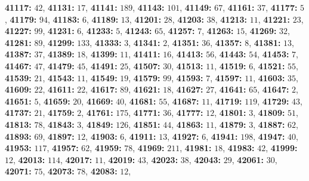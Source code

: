 \textsf{\bfseries 41117:} $42$, \textsf{\bfseries 41131:} $17$, \textsf{\bfseries 41141:} $189$, \textsf{\bfseries 41143:} $101$, \textsf{\bfseries 41149:} $67$, \textsf{\bfseries 41161:} $37$, \textsf{\bfseries 41177:} $5$, \textsf{\bfseries 41179:} $94$, \textsf{\bfseries 41183:} $6$, \textsf{\bfseries 41189:} $13$, \textsf{\bfseries 41201:} $28$, \textsf{\bfseries 41203:} $38$, \textsf{\bfseries 41213:} $11$, \textsf{\bfseries 41221:} $23$, \textsf{\bfseries 41227:} $99$, \textsf{\bfseries 41231:} $6$, \textsf{\bfseries 41233:} $5$, \textsf{\bfseries 41243:} $65$, \textsf{\bfseries 41257:} $7$, \textsf{\bfseries 41263:} $15$, \textsf{\bfseries 41269:} $32$, \textsf{\bfseries 41281:} $89$, \textsf{\bfseries 41299:} $133$, \textsf{\bfseries 41333:} $3$, \textsf{\bfseries 41341:} $2$, \textsf{\bfseries 41351:} $36$, \textsf{\bfseries 41357:} $8$, \textsf{\bfseries 41381:} $13$, \textsf{\bfseries 41387:} $37$, \textsf{\bfseries 41389:} $18$, \textsf{\bfseries 41399:} $11$, \textsf{\bfseries 41411:} $16$, \textsf{\bfseries 41413:} $56$, \textsf{\bfseries 41443:} $54$, \textsf{\bfseries 41453:} $7$, \textsf{\bfseries 41467:} $47$, \textsf{\bfseries 41479:} $45$, \textsf{\bfseries 41491:} $25$, \textsf{\bfseries 41507:} $30$, \textsf{\bfseries 41513:} $11$, \textsf{\bfseries 41519:} $6$, \textsf{\bfseries 41521:} $55$, \textsf{\bfseries 41539:} $21$, \textsf{\bfseries 41543:} $11$, \textsf{\bfseries 41549:} $19$, \textsf{\bfseries 41579:} $99$, \textsf{\bfseries 41593:} $7$, \textsf{\bfseries 41597:} $11$, \textsf{\bfseries 41603:} $35$, \textsf{\bfseries 41609:} $22$, \textsf{\bfseries 41611:} $22$, \textsf{\bfseries 41617:} $89$, \textsf{\bfseries 41621:} $18$, \textsf{\bfseries 41627:} $27$, \textsf{\bfseries 41641:} $65$, \textsf{\bfseries 41647:} $2$, \textsf{\bfseries 41651:} $5$, \textsf{\bfseries 41659:} $20$, \textsf{\bfseries 41669:} $40$, \textsf{\bfseries 41681:} $55$, \textsf{\bfseries 41687:} $11$, \textsf{\bfseries 41719:} $119$, \textsf{\bfseries 41729:} $43$, \textsf{\bfseries 41737:} $21$, \textsf{\bfseries 41759:} $2$, \textsf{\bfseries 41761:} $175$, \textsf{\bfseries 41771:} $36$, \textsf{\bfseries 41777:} $12$, \textsf{\bfseries 41801:} $3$, \textsf{\bfseries 41809:} $51$, \textsf{\bfseries 41813:} $78$, \textsf{\bfseries 41843:} $3$, \textsf{\bfseries 41849:} $126$, \textsf{\bfseries 41851:} $44$, \textsf{\bfseries 41863:} $11$, \textsf{\bfseries 41879:} $3$, \textsf{\bfseries 41887:} $62$, \textsf{\bfseries 41893:} $69$, \textsf{\bfseries 41897:} $12$, \textsf{\bfseries 41903:} $6$, \textsf{\bfseries 41911:} $13$, \textsf{\bfseries 41927:} $6$, \textsf{\bfseries 41941:} $198$, \textsf{\bfseries 41947:} $40$, \textsf{\bfseries 41953:} $117$, \textsf{\bfseries 41957:} $62$, \textsf{\bfseries 41959:} $78$, \textsf{\bfseries 41969:} $211$, \textsf{\bfseries 41981:} $18$, \textsf{\bfseries 41983:} $42$, \textsf{\bfseries 41999:} $12$, \textsf{\bfseries 42013:} $114$, \textsf{\bfseries 42017:} $11$, \textsf{\bfseries 42019:} $43$, \textsf{\bfseries 42023:} $38$, \textsf{\bfseries 42043:} $29$, \textsf{\bfseries 42061:} $30$, \textsf{\bfseries 42071:} $75$, \textsf{\bfseries 42073:} $78$, \textsf{\bfseries 42083:} $12$, 
